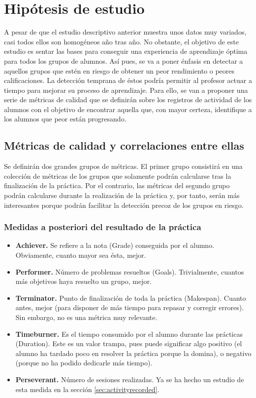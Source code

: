 \chapter{Hipótesis de estudio}

A pesar de que el estudio descriptivo anterior muestra unos datos muy variados, casi todos ellos son homogéneos año tras año. No obstante, el objetivo de este estudio es sentar las bases para conseguir una experiencia de aprendizaje óptima para todos los grupos de alumnos. Así pues, se va a poner énfasis en detectar a aquellos grupos que estén en riesgo de obtener un peor rendimiento o peores calificaciones. La detección temprana de éstos podría permitir al profesor actuar a tiempo para mejorar su proceso de aprendizaje. Para ello, se van a proponer una serie de métricas de calidad que se definirán sobre los registros de actividad de los alumnos con el objetivo de encontrar aquella que, con mayor certeza, identifique a los alumnos que peor están progresando.

\section{Métricas de calidad y correlaciones entre ellas}

Se definirán dos grandes grupos de métricas. El primer grupo consistirá en una colección de métricas de los grupos que solamente podrán calcularse tras la finalización de la práctica. Por el contrario, las métricas del segundo grupo podrán calcularse durante la realización de la práctica y, por tanto, serán más interesantes porque podrán facilitar la detección precoz de los grupos en riesgo.

\subsection{Medidas a posteriori del resultado de la práctica}

\begin{itemize}
\item \textbf{Achiever.} Se refiere a la nota (Grade) conseguida por el alumno. Obviamente, cuanto mayor sea ésta, mejor.
\item \textbf{Performer.} Número de problemas resueltos (Goals). Trivialmente, cuantos más objetivos haya resuelto un grupo, mejor.
\item \textbf{Terminator.} Punto de finalización de toda la práctica (Makespan). Cuanto antes, mejor (para disponer de más tiempo para repasar y corregir errores). Sin embargo, no es una métrica muy relevante.
\item \textbf{Timeburner.} Es el tiempo consumido por el alumno durante las prácticas (Duration). Este es un valor trampa, pues puede significar algo positivo (el alumno ha tardado poco en resolver la práctica porque la domina), o negativo (porque no ha podido dedicarle más tiempo).
\item \textbf{Perseverant.} Número de sesiones realizadas. Ya se ha hecho un estudio de esta medida en la sección \ref{sec:activityrecorded}.
\end{itemize}

